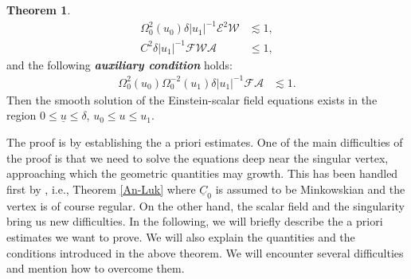 \documentclass[11pt,reqno]{amsart}
\theoremstyle{definition}
\newtheorem{theorem}{Theorem}[section]
\numberwithin{equation}{section}
\def\ub{\underline{u}}
\def\Cb{\underline{C}}
\begin{document}
\begin{theorem}
\begin{align}
\label{smallness1-intro}\Omega_0^2(u_0)\delta|u_1|^{-1}\mathscr{E}^2\mathscr{W}&\lesssim 1,\\
\label{smallness-intro} C^2\delta|u_1|^{-1}\mathscr{F}\mathscr{W}\mathcal{A}&\le 1,
\end{align}
and the following {\bf \emph{auxiliary condition}} holds:
\begin{equation}\label{auxiliary-intro}
\begin{split}
\Omega_0^2(u_0)\Omega_0^{-2}(u_1)\delta|u_1|^{-1}\mathscr{F}\mathcal{A}&\lesssim 1.
\end{split}
\end{equation}
Then the smooth solution of the Einstein-scalar field equations exists in the region $0\le\ub\le\delta$, $u_0\le u\le u_1$.
\end{theorem}



The proof is by establishing the a priori estimates. One of the main difficulties of the proof is that we need to solve the equations deep near the singular vertex, approaching which the geometric quantities may growth. This has been handled first by \cite{An-Luk}, i.e., Theorem \ref{An-Luk} where $\Cb_0$ is assumed to be Minkowskian and the vertex is of course regular. On the other hand, the scalar field and the singularity bring us new difficulties. In the following, we will briefly describe the a priori estimates we want to prove. We will also explain the quantities and the conditions introduced in the above theorem. We will encounter several difficulties and mention how to overcome them.
\end{document}
